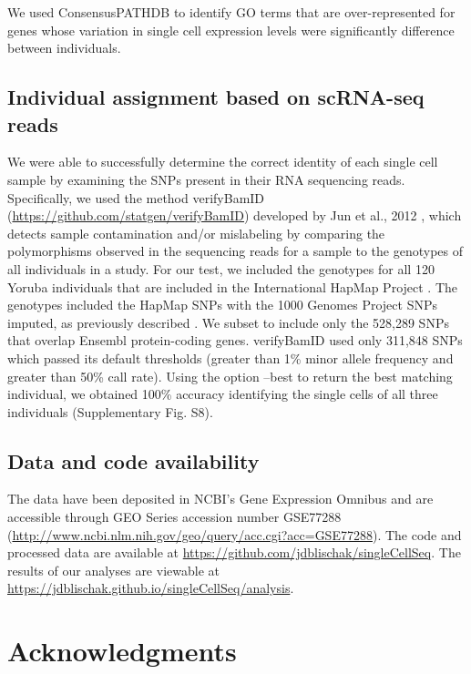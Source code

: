 We used ConsensusPATHDB \citep{Kamburov2011} to identify GO terms that
are over-represented for genes whose variation in single cell expression
levels were significantly difference between individuals.

\subsection{Individual assignment based on scRNA-seq
reads}\label{individual-assignment-based-on-scrna-seq-reads}

We were able to successfully determine the correct identity of each
single cell sample by examining the SNPs present in their RNA sequencing
reads. Specifically, we used the method verifyBamID
(\url{https://github.com/statgen/verifyBamID}) developed by Jun et al.,
2012 \citep{Jun2012}, which detects sample contamination and/or
mislabeling by comparing the polymorphisms observed in the sequencing
reads for a sample to the genotypes of all individuals in a study. For
our test, we included the genotypes for all 120 Yoruba individuals that
are included in the International HapMap Project
\citep{HapMapConsortium2005}. The genotypes included the HapMap SNPs with
the 1000 Genomes Project SNPs \citep{OneKGConsortium2012} imputed, as
previously described \citep{McVicker2013}. We subset to include only the
528,289 SNPs that overlap Ensembl protein-coding genes. verifyBamID used
only 311,848 SNPs which passed its default thresholds (greater than 1\%
minor allele frequency and greater than 50\% call rate). Using the
option --best to return the best matching individual, we obtained 100\%
accuracy identifying the single cells of all three individuals
(Supplementary Fig. S8).

\subsection{Data and code
availability}\label{data-and-code-availability}

The data have been deposited in NCBI's Gene Expression Omnibus
\citep{Edgar2002} and are accessible through GEO Series accession number
GSE77288
(\url{http://www.ncbi.nlm.nih.gov/geo/query/acc.cgi?acc=GSE77288}). The
code and processed data are available at
\url{https://github.com/jdblischak/singleCellSeq}. The results of our
analyses are viewable at
\url{https://jdblischak.github.io/singleCellSeq/analysis}.

\section{Acknowledgments}\label{acknowledgments}

